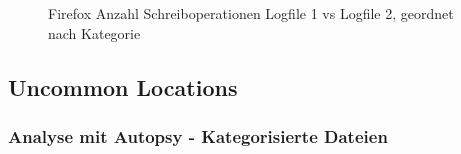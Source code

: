 \begin{appendices}
\begin{figure}[h!]
	\caption{Firefox Anzahl Schreiboperationen Logfile 1 vs Logfile 2, geordnet nach Kategorie}
	\label{chart:firefox-writefile-logfile1v2}
\end{figure}


\subsection{Uncommon Locations}
\label{subsection:appendix-firefox-uncommon-locations}

\subsubsection*{Analyse mit Autopsy - Kategorisierte Dateien}
\label{subsubsection:appendix-firefox-uncommon-locations-autopsy}


\end{appendices}
